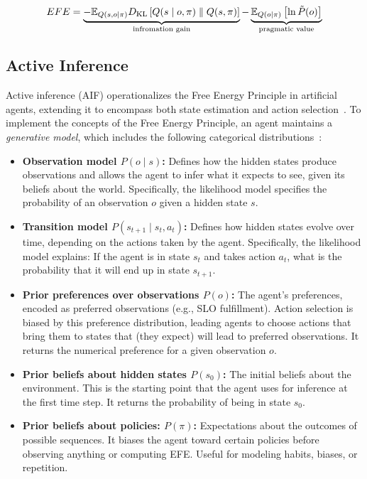 \begin{equation}
EFE=\underbrace{-\mathbb{E}_{Q(s, o \mid \pi)} D_\mathrm{KL} \left[ Q(s \mid o, \pi) \parallel Q(s, \pi) \right] }_{\text{infromation gain}} - \underbrace{\mathbb{E}_{Q(o \mid \pi)} \left[ \ln \Tilde{P}(o) \right]}_{\text{pragmatic value}}
\end{equation}

\subsection{Active Inference}
Active inference (AIF) operationalizes the Free Energy Principle in artificial agents, extending it to encompass both state estimation and action selection~\cite{sedlak_equilibrium_2024, lanillos_active_2021}. To implement the concepts of the Free Energy Principle, an agent maintains a \textit{generative model}, which includes the following categorical distributions~\cite{heins_pymdp_2022}:

\begin{itemize}
  \item \textbf{Observation model \(P(o \mid s)\):} Defines how the hidden states produce observations and allows the agent to infer what it expects to see, given its beliefs about the world. Specifically, the likelihood model specifies the probability of an observation \(o\) given a hidden state \(s\). 
  \item \textbf{Transition model \(P(s_{t+1} \mid s_t,a_t)\):} Defines how hidden states evolve over time, depending on the actions taken by the agent. Specifically, the likelihood model explains: If the agent is in state \(s_t\) and takes action \(a_t\), what is the probability that it will end up in state \(s_{t+1}\). 
  \item \textbf{Prior preferences over observations \(P(o)\):} The agent's preferences, encoded as preferred observations (e.g., SLO fulfillment). Action selection is biased by this preference distribution, leading agents to choose actions that bring them to states that (they expect) will lead to preferred observations. It returns the numerical preference for a given observation \(o\).
  \item \textbf{Prior beliefs about hidden states \(P(s_0)\):} The initial beliefs about the environment. This is the starting point that the agent uses for inference at the first time step. It returns the probability of being in state \(s_0\).
  \item \textbf{Prior beliefs about policies: \(P(\pi)\):} Expectations about the outcomes of possible sequences. It biases the agent toward certain policies before observing anything or computing EFE. Useful for modeling habits, biases, or repetition.
\end{itemize}

